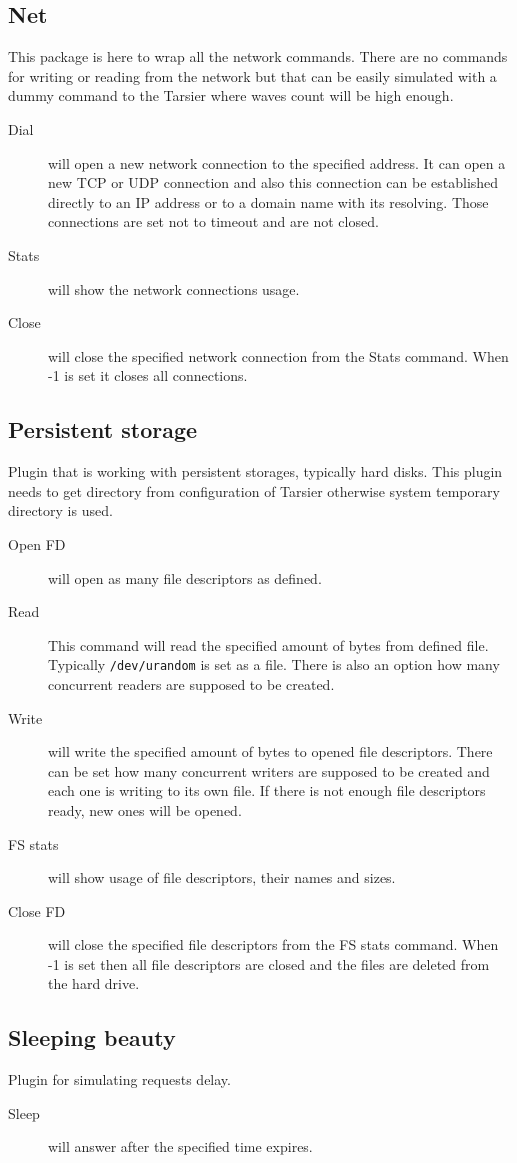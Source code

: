 \subsection{Net}
This package is here to wrap all the network commands. There are no commands for writing or reading from the network but that can be easily simulated with a dummy command to the Tarsier where waves count will be high enough.

\begin{description}
  \item[Dial] will open a new network connection to the specified address. It can open a new TCP or UDP connection and also this connection can be established directly to an IP address or to a domain name with its resolving. Those connections are set not to timeout and are not closed.
  \item[Stats] will show the network connections usage.
  \item[Close] will close the specified network connection from the Stats command. When -1 is set it closes all connections.
\end{description}

\subsection{Persistent storage}
Plugin that is working with persistent storages, typically hard disks. This plugin needs to get directory from configuration of Tarsier otherwise system temporary directory is used.

\begin{description}
  \item[Open FD] will open as many file descriptors as defined.
  \item[Read] This command will read the specified amount of bytes from defined file. Typically \lstinline{/dev/urandom} is set as a file. There is also an option how many concurrent readers are supposed to be created.
  \item[Write] will write the specified amount of bytes to opened file descriptors. There can be set how many concurrent writers are supposed to be created and each one is writing to its own file. If there is not enough file descriptors ready, new ones will be opened.
  \item[FS stats] will show usage of file descriptors, their names and sizes.
  \item[Close FD] will close the specified file descriptors from the FS stats command. When -1 is set then all file descriptors are closed and the files are deleted from the hard drive.
\end{description}

\subsection{Sleeping beauty}
Plugin for simulating requests delay.
\begin{description}
  \item[Sleep] will answer after the specified time expires.
\end{description}
